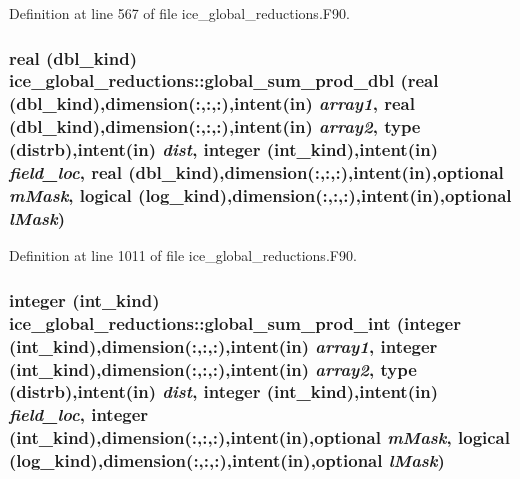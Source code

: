 Definition at line 567 of file ice\_\-global\_\-reductions.F90.\hypertarget{namespaceice__global__reductions_aafaab9f2e8ca36d2f081b9e3a0caef2c}{
\subsubsection[{global\_\-sum\_\-prod\_\-dbl}]{\setlength{\rightskip}{0pt plus 5cm}real (dbl\_\-kind) ice\_\-global\_\-reductions::global\_\-sum\_\-prod\_\-dbl (real (dbl\_\-kind),dimension(:,:,:),intent(in) {\em array1}, \/  real (dbl\_\-kind),dimension(:,:,:),intent(in) {\em array2}, \/  type (distrb),intent(in) {\em dist}, \/  integer (int\_\-kind),intent(in) {\em field\_\-loc}, \/  real (dbl\_\-kind),dimension(:,:,:),intent(in),optional {\em mMask}, \/  logical (log\_\-kind),dimension(:,:,:),intent(in),optional {\em lMask})}}
\label{namespaceice__global__reductions_aafaab9f2e8ca36d2f081b9e3a0caef2c}


Definition at line 1011 of file ice\_\-global\_\-reductions.F90.\hypertarget{namespaceice__global__reductions_a4aff2c1b8fa4c266a0f08cef29bba2ab}{
\subsubsection[{global\_\-sum\_\-prod\_\-int}]{\setlength{\rightskip}{0pt plus 5cm}integer (int\_\-kind) ice\_\-global\_\-reductions::global\_\-sum\_\-prod\_\-int (integer (int\_\-kind),dimension(:,:,:),intent(in) {\em array1}, \/  integer (int\_\-kind),dimension(:,:,:),intent(in) {\em array2}, \/  type (distrb),intent(in) {\em dist}, \/  integer (int\_\-kind),intent(in) {\em field\_\-loc}, \/  integer (int\_\-kind),dimension(:,:,:),intent(in),optional {\em mMask}, \/  logical (log\_\-kind),dimension(:,:,:),intent(in),optional {\em lMask})}}
\label{namespaceice__global__reductions_a4aff2c1b8fa4c266a0f08cef29bba2ab}


